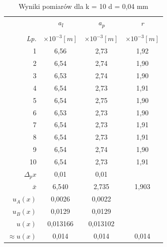 \documentclass[polish, 11pt, a4paper]{article}
\begin{document}
\begin{table}[H]
\begin{minipage}{.5\textwidth}
			\caption{Wyniki pomiarów dla k = 10 \newline d = 0,04 mm}
			\begin{tabular}{|r|c|c|c|} \hline
					&	\textit{a\textsubscript{l}}	&	\textit{a\textsubscript{p}}	&	\textit{r}	\\
				&&& \\[-1em]
				\textit{Lp.}& \(\times{10^{-3} [m]}\)& \(\times{10^{-3} [m]}\)& \(\times{10^{-3} [m]}\) \\\hline
				1	&	6,56	&	2,73	&	1,92	\\\hline
				2	&	6,54	&	2,74	&	1,90	\\\hline
				3	&	6,53	&	2,74	&	1,90	\\\hline
				4	&	6,54	&	2,73	&	1,91	\\\hline
				5	&	6,54	&	2,75	&	1,90	\\\hline
				6	&	6,53	&	2,73	&	1,90	\\\hline
				7	&	6,54	&	2,73	&	1,91	\\\hline
				8	&	6,54	&	2,73	&	1,91	\\\hline
				9	&	6,54	&	2,74	&	1,90	\\\hline
				10	&	6,54	&	2,73	&	1,91	\\\hline
				\(\Delta{_px}\)	&	0,01	&	0,01	&		\\\hline
				\(\bar{x}\)	&	6,540	&	2,735	&	1,903	\\\hline
				\(u_A(x)\)	&	0,0026	&	0,0022	&		\\\hline
				\(u_B(x)\)	&	0,0129	&	0,0129	&		\\\hline
				\(u(x)\)	&	0,013166	&	0,013102	&		\\\hline
				\(\approx{u(x)}\)	&	0,014	&	0,014	&	0,014	\\\hline
			\end{tabular}
		
			
		
		\end{minipage}
	
		\end{table}
	\newpage
\end{document}
